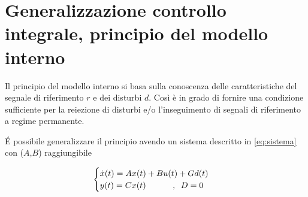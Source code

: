 \section{Generalizzazione controllo integrale, principio del modello interno}
\label{sec:modelloInterno}

	Il principio del modello interno si basa sulla conoscenza delle caratteristiche del segnale di riferimento $r$ e dei disturbi $d$. Così è in grado di fornire una condizione sufficiente per la reiezione di disturbi e/o l'inseguimento di segnali di riferimento a regime permanente. 
%	
%		
%		
	
	\noindent É possibile generalizzare il principio avendo un sistema descritto in \ref{eq:sistema} con ($A$,$B$) raggiungibile
	
	\begin{equation}
		\begin{cases}
			\dot{x}(t)=Ax(t)+Bu(t)+Gd(t) \\
			y(t)=Cx(t) \trippleSpacing \trippleSpacing, \singleSpacing D=0
		\end{cases}
		\label{eq:sistema}
	\end{equation}
	  
